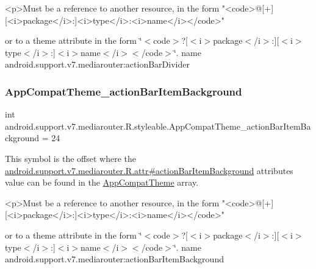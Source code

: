 \begin{DoxyVerb}      <p>Must be a reference to another resource, in the form "<code>@[+][<i>package</i>:]<i>type</i>:<i>name</i></code>"
\end{DoxyVerb}
 or to a theme attribute in the form \char`\"{}$<$code$>$?\mbox{[}$<$i$>$package$<$/i$>$\+:\mbox{]}\mbox{[}$<$i$>$type$<$/i$>$\+:\mbox{]}$<$i$>$name$<$/i$>$$<$/code$>$\char`\"{}.  name android.\+support.\+v7.\+mediarouter\+:action\+Bar\+Divider \mbox{\label{classandroid_1_1support_1_1v7_1_1mediarouter_1_1R_1_1styleable_a90c427e103e51830dfc3b0742ec37ff4}} 
\subsubsection{\texorpdfstring{App\+Compat\+Theme\+\_\+action\+Bar\+Item\+Background}{AppCompatTheme\_actionBarItemBackground}}
{\footnotesize\ttfamily int android.\+support.\+v7.\+mediarouter.\+R.\+styleable.\+App\+Compat\+Theme\+\_\+action\+Bar\+Item\+Background = 24\hspace{0.3cm}{\ttfamily [static]}}

This symbol is the offset where the \hyperlink{classandroid_1_1support_1_1v7_1_1mediarouter_1_1R_1_1attr_acf2d518fb015adaa3c6f71ae62af3d15}{android.\+support.\+v7.\+mediarouter.\+R.\+attr\#action\+Bar\+Item\+Background} attribute\textquotesingle{}s value can be found in the \hyperlink{classandroid_1_1support_1_1v7_1_1mediarouter_1_1R_1_1styleable_a4e3d3900c75d49aeb2f283cac00214d6}{App\+Compat\+Theme} array.

\begin{DoxyVerb}      <p>Must be a reference to another resource, in the form "<code>@[+][<i>package</i>:]<i>type</i>:<i>name</i></code>"
\end{DoxyVerb}
 or to a theme attribute in the form \char`\"{}$<$code$>$?\mbox{[}$<$i$>$package$<$/i$>$\+:\mbox{]}\mbox{[}$<$i$>$type$<$/i$>$\+:\mbox{]}$<$i$>$name$<$/i$>$$<$/code$>$\char`\"{}.  name android.\+support.\+v7.\+mediarouter\+:action\+Bar\+Item\+Background \mbox{\label{classandroid_1_1support_1_1v7_1_1mediarouter_1_1R_1_1styleable_af1394a44da974408e6b670d517a5c780}} 
